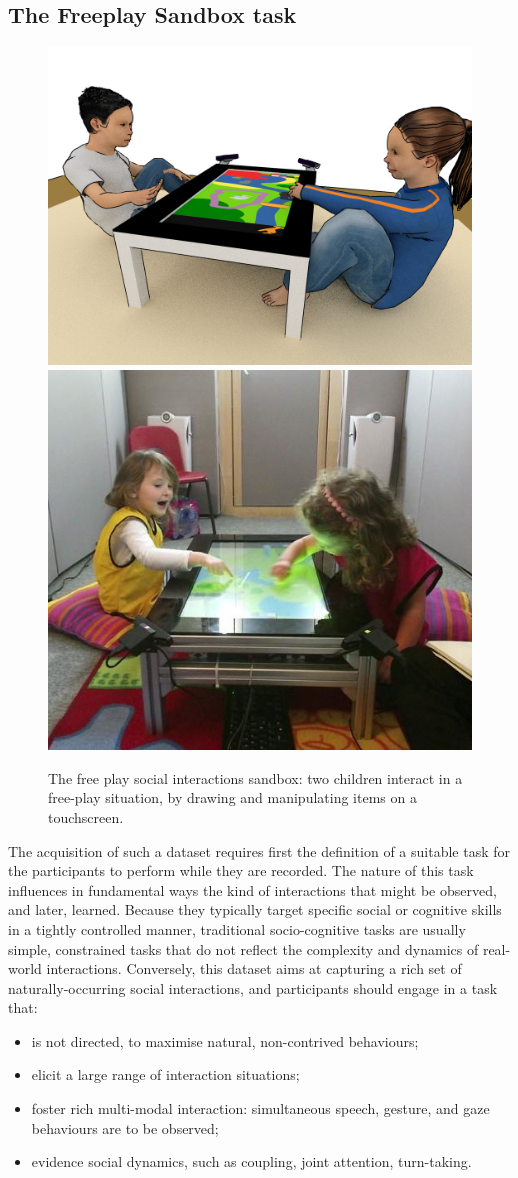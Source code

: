 \documentclass{article}
\begin{document}
\subsection{The Freeplay Sandbox task}

\begin{figure}
    \centering
    \includegraphics[width=0.55\linewidth]{setup-child-child.png}
    \hspace{1em}
    \includegraphics[width=0.4\linewidth]{child-child-env}
    \caption{The free play social interactions sandbox: two children interact in
    a free-play situation, by drawing and manipulating items on a touchscreen.}
    \label{fig|freeplay}
\end{figure}

The acquisition of such a dataset requires first the definition of a suitable
task for the participants to perform while they are recorded. The nature of
this task influences in fundamental ways the kind of interactions that might be
observed, and later, learned. Because they typically target specific social
or cognitive skills in a tightly controlled manner, traditional socio-cognitive tasks are
usually simple, constrained tasks that do not reflect the complexity and dynamics of
real-world interactions. Conversely, this dataset aims at capturing a rich set
of naturally-occurring social interactions, and participants should engage in a task that:

\begin{itemize}
    \item is not directed, to maximise natural, non-contrived behaviours;
    \item elicit a large range of interaction situations;
    \item foster rich multi-modal interaction: simultaneous speech, gesture, and gaze
        behaviours are to be observed;
    \item evidence social dynamics, such as coupling, joint attention, turn-taking.
\end{itemize}
\end{document}

